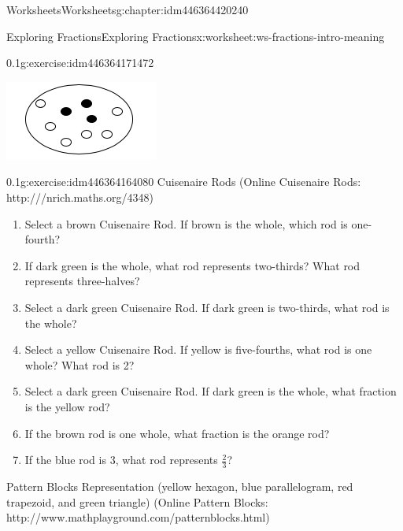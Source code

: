 \documentclass[twoside,11pt,]{book}
\begin{document}
\begin{chapterptx}{Worksheets}{}{Worksheets}{}{}{g:chapter:idm446364420240}
\begin{worksheet-section-numberless}{Exploring Fractions}{}{Exploring Fractions}{}{}{x:worksheet:ws-fractions-intro-meaning}
\begin{divisionexercise}{2}{}{0.1}{g:exercise:idm446364171472}
\begin{enumerate}[label=(\alph*)]
\begin{sidebyside}{1}{0.35}{0.35}{0}
\begin{sbspanel}{0.3}
\includegraphics[width=1\linewidth]{images/counters-one-third.png}
\end{sbspanel}%
\end{sidebyside}%
%
\end{enumerate}
\end{divisionexercise}%
\clearpage
\begin{divisionexercise}{3}{}{0.1}{g:exercise:idm446364164080}%
Cuisenaire Rods (Online Cuisenaire Rods: http:\slash{}\slash{}\slash{}nrich.maths.org\slash{}4348)%
%
\begin{enumerate}[label=(\alph*)]
\item{}Select a brown Cuisenaire Rod.  If brown is the whole, which rod is one-fourth?%
\item{}If dark green is the whole, what rod represents two-thirds? What rod represents three-halves?%
\item{}Select a dark green Cuisenaire Rod.  If dark green is two-thirds, what rod is the whole?%
\item{}Select a yellow Cuisenaire Rod.  If yellow is five-fourths, what rod is one whole? What rod is 2?%
\item{}Select a dark green Cuisenaire Rod.  If dark green is the whole, what fraction is the yellow rod?%
\item{}If the brown rod is one whole, what fraction is the orange rod?%
\item{}If the blue rod is 3, what rod represents \(\frac{2}{3} \)?%
\end{enumerate}
\end{divisionexercise}%
\begin{introduction}{}%
Pattern Blocks Representation (yellow hexagon, blue parallelogram, red trapezoid, and green triangle) (Online Pattern Blocks: http:\slash{}\slash{}www.mathplayground.com\slash{}patternblocks.html)%
\end{introduction}%

\end{worksheet-section-numberless}
\end{chapterptx}
\end{document}
